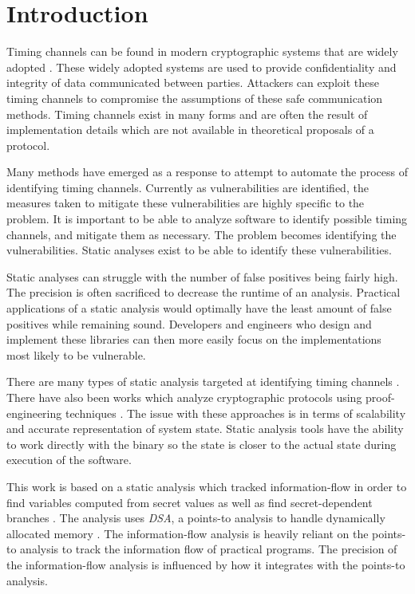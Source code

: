 \section{Introduction}

Timing channels can be found in modern cryptographic systems that are widely
adopted \cite{kochertiming,brumley2005remote,percival2005cache,bernstein2017sliding}.
These widely adopted systems are used to provide confidentiality and integrity
of data communicated between parties. Attackers can exploit these timing
channels to compromise the assumptions of these safe communication methods.
Timing channels exist in many forms and are often the result of implementation
details which are not available in theoretical proposals of a protocol.

Many methods have emerged as a response to attempt to automate the process of
identifying timing channels. Currently as vulnerabilities are
identified, the measures taken to mitigate these vulnerabilities are highly
specific to the problem. It is important to be able to analyze software to
identify possible timing channels, and mitigate them as necessary. The problem
becomes identifying the vulnerabilities. Static analyses exist to be able to
identify these vulnerabilities.
  
  Static analyses can struggle with the number of false positives being fairly
  high. The precision is often sacrificed to decrease the runtime of an
  analysis. Practical applications of a static analysis would optimally have the
  least amount of false positives while remaining sound. Developers and
  engineers who design and implement these libraries can then more easily focus
  on the implementations most likely to be vulnerable.
  
  There are many types of static analysis targeted at identifying timing
  channels \cite{cached-zhang, brotzmancasym, molnar2005program}. There have also been
  works which analyze cryptographic protocols using proof-engineering techniques
  \cite{proof-engineering}. The issue with these approaches is in terms of
  scalability and accurate representation of system state. Static analysis tools
  have the ability to work directly with the binary so the state is closer to
  the actual state during execution of the software.

  This work is based on a static analysis which tracked information-flow in
  order to find variables computed from secret values as well as find
  secret-dependent branches \cite{moore2011static}. The analysis uses
  \textit{DSA}, a points-to analysis to handle dynamically allocated memory
  \cite{DSA-lattner}. The information-flow analysis is heavily reliant on the
  points-to analysis to track the information flow of practical programs. The
  precision of the information-flow analysis is influenced by how it integrates
  with the points-to analysis.
  
